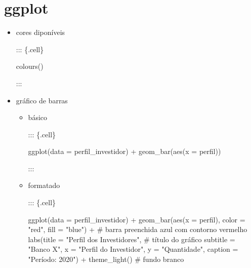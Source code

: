 \documentclass[
  letterpaper,
  DIV=11,
  numbers=noendperiod]{scrreprt}
\newenvironment{Shaded}{\begin{snugshade}}{\end{snugshade}}
\newcommand{\AttributeTok}[1]{\textcolor[rgb]{0.40,0.45,0.13}{#1}}
\newcommand{\CommentTok}[1]{\textcolor[rgb]{0.37,0.37,0.37}{#1}}
\newcommand{\FunctionTok}[1]{\textcolor[rgb]{0.28,0.35,0.67}{#1}}
\newcommand{\NormalTok}[1]{\textcolor[rgb]{0.00,0.23,0.31}{#1}}
\newcommand{\SpecialCharTok}[1]{\textcolor[rgb]{0.37,0.37,0.37}{#1}}
\newcommand{\StringTok}[1]{\textcolor[rgb]{0.13,0.47,0.30}{#1}}
\begin{document}
\hypertarget{ggplot}{%
\section{ggplot}\label{ggplot}}

\begin{itemize}
\item
  cores diponíveis

  ::: \{.cell\}

\begin{Shaded}
\begin{Highlighting}[]
\FunctionTok{colours}\NormalTok{()}
\end{Highlighting}
\end{Shaded}

  :::
\item
  gráfico de barras

  \begin{itemize}
  \item
    básico

    ::: \{.cell\}

\begin{Shaded}
\begin{Highlighting}[]
    \FunctionTok{ggplot}\NormalTok{(}\AttributeTok{data =}\NormalTok{ perfil\_investidor) }\SpecialCharTok{+}
        \FunctionTok{geom\_bar}\NormalTok{(}\FunctionTok{aes}\NormalTok{(}\AttributeTok{x =}\NormalTok{ perfil))}
\end{Highlighting}
\end{Shaded}

    :::
  \item
    formatado

    ::: \{.cell\}

\begin{Shaded}
\begin{Highlighting}[]
    \FunctionTok{ggplot}\NormalTok{(}\AttributeTok{data =}\NormalTok{ perfil\_investidor) }\SpecialCharTok{+}
        \FunctionTok{geom\_bar}\NormalTok{(}\FunctionTok{aes}\NormalTok{(}\AttributeTok{x =}\NormalTok{ perfil), }\AttributeTok{color =} \StringTok{"red"}\NormalTok{, }\AttributeTok{fill =} \StringTok{"blue"}\NormalTok{) }\SpecialCharTok{+} \CommentTok{\# barra preenchida azul com contorno vermelho}
        \FunctionTok{labs}\NormalTok{(}\AttributeTok{title =} \StringTok{"Perfil dos Investidores"}\NormalTok{, }\CommentTok{\# título do gráfico}
            \AttributeTok{subtitle =} \StringTok{"Banco X"}\NormalTok{,}
            \AttributeTok{x =} \StringTok{"Perfil do Investidor"}\NormalTok{,}
            \AttributeTok{y =} \StringTok{"Quantidade"}\NormalTok{,}
            \AttributeTok{caption =} \StringTok{"Período: 2020"}\NormalTok{) }\SpecialCharTok{+}
        \FunctionTok{theme\_light}\NormalTok{() }\CommentTok{\# fundo branco}
\end{Highlighting}
\end{Shaded}


\end{itemize}
\end{itemize}
\end{document}
